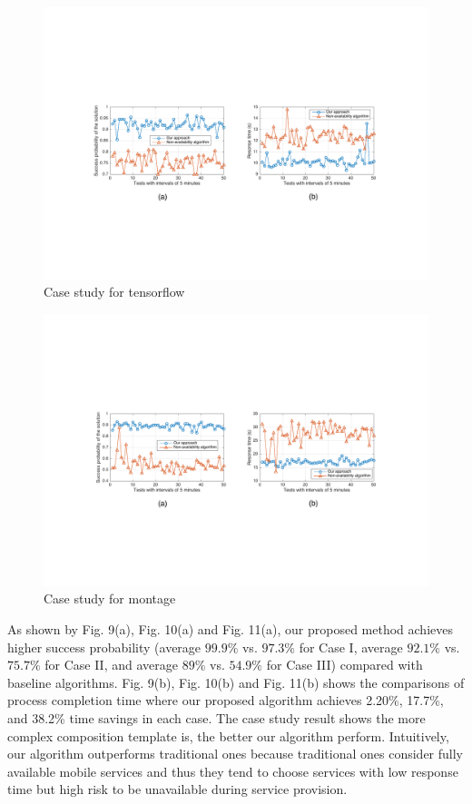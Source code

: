 \documentclass[journal]{IEEEtran}
\begin{document}
\begin{figure}[!t]
\centering
\includegraphics[width=6in]{./img/Task-12.pdf}
\caption{Case study for tensorflow}
\label{Task-12}
\end{figure}

\begin{figure}[!t]
\centering
\includegraphics[width=6in]{./img/Task-24.pdf}
\caption{Case study for montage}
\label{Task-24}
\end{figure}

As shown by Fig. 9(a), Fig. 10(a) and Fig. 11(a), our proposed method achieves higher success probability (average $99.9\%$ vs. $97.3\%$ for Case I, average $92.1\%$ vs. $75.7\%$ for Case II, and average $89\%$ vs. $54.9\%$ for Case III) compared with baseline algorithms.
Fig. 9(b), Fig. 10(b) and Fig. 11(b) shows the comparisons of process completion time where our proposed algorithm achieves 2.20\%, 17.7\%, and 38.2\% time savings in each case. The case study result shows the more complex composition template is, the better our algorithm perform.
Intuitively, our algorithm outperforms traditional ones because traditional ones consider fully available mobile services and thus they tend to choose services with low response time but high risk to be unavailable during service provision.
\end{document}
